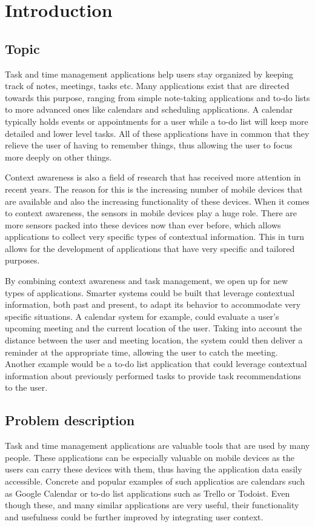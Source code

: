 \chapter{Introduction}
\label{chap:introduction}



\section{Topic}
Task and time management applications help users stay organized by keeping track of notes, meetings, tasks etc. Many applications exist that are directed towards this purpose, ranging from simple note-taking applications and to-do lists to more advanced ones like calendars and scheduling applications. A calendar typically holds events or appointments for a user while a to-do list will keep more detailed and lower level tasks. All of these applications have in common that they relieve the user of having to remember things, thus allowing the user to focus more deeply on other things.

Context awareness is also a field of research that has received more attention in recent years. The reason for this is the increasing number of mobile devices that are available and also the increasing functionality of these devices. When it comes to context awareness, the sensors in mobile devices play a huge role. There are more sensors packed into these devices now than ever before, which allows applications to collect very specific types of contextual information. This in turn allows for the development of applications that have very specific and tailored purposes.

By combining context awareness and task management, we open up for new types of applications. Smarter systems could be built that leverage contextual information, both past and present, to adapt its behavior to accommodate very specific situations. A calendar system for example, could evaluate a user's upcoming meeting and the current location of the user. Taking into account the distance between the user and meeting location, the system could then deliver a reminder at the appropriate time, allowing the user to catch the meeting. Another example would be a to-do list application that could leverage contextual information about previously performed tasks to provide task recommendations to the user.





\section{Problem description}
Task and time management applications are valuable tools that are used by many people. These applications can be especially valuable on mobile devices as the users can carry these devices with them, thus having the application data easily accessible. Concrete and popular examples of such applicatios are calendars such as Google Calendar\cite{googlecalendar} or to-do list applications such as Trello\cite{trello} or Todoist\cite{todoist}. Even though these, and many similar applications are very useful, their functionality and usefulness could be further improved by integrating user context. 

